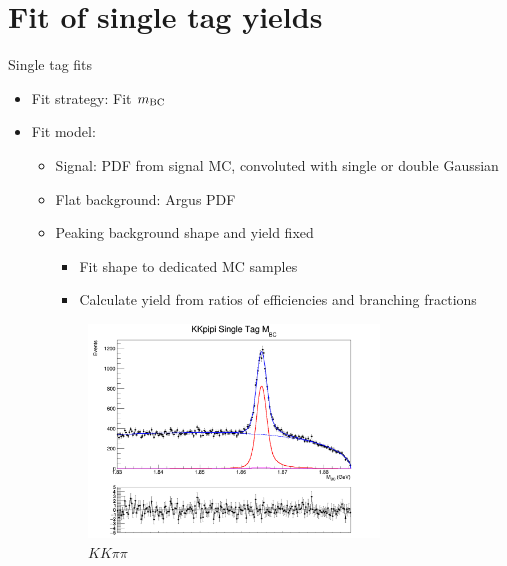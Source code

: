 \documentclass{beamer}
\begin{document}
\section{Fit of single tag yields}
\begin{frame}{Single tag fits}
  \begin{itemize}
    \item{Fit strategy: Fit $m_{\rm BC}$}
    \item{Fit model:}
    \begin{itemize}
      \item{Signal: PDF from signal MC, convoluted with single or double Gaussian}
      \item{Flat background: Argus PDF}
      \item{Peaking background shape and yield fixed}
      \begin{itemize}
        \item{Fit shape to dedicated MC samples}
        \item{Calculate yield from ratios of efficiencies and branching fractions}
      \end{itemize}
    \end{itemize}
  \end{itemize}
  \begin{figure}
    \centering
    \begin{subfigure}{0.5\textwidth}
      \centering
      \includegraphics[width=0.85\textwidth]{Plots/KKpipi_SingleTag_MBC_Plot.png}
      \caption{$KK\pi\pi$}
    \end{subfigure}%
    \begin{subfigure}{0.5\textwidth}
      \centering

\end{subfigure}
\end{figure}
\end{frame}
\end{document}
